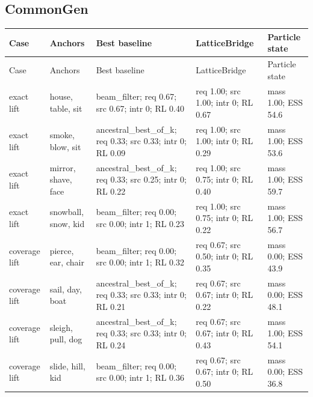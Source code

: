 \begingroup
\scriptsize
\setlength{\tabcolsep}{2pt}
\setlength{\LTleft}{0pt}
\setlength{\LTright}{0pt}
\renewcommand{\arraystretch}{1.08}

\subsection*{CommonGen}
\begin{longtable}{>{\raggedright\arraybackslash}p{}>{\raggedright\arraybackslash}p{}>{\raggedright\arraybackslash}p{}>{\raggedright\arraybackslash}p{}>{\raggedright\arraybackslash}p{}}
\toprule
Case & Anchors & Best baseline & LatticeBridge & Particle state \\
\midrule
\endfirsthead
\toprule
Case & Anchors & Best baseline & LatticeBridge & Particle state \\
\midrule
\endhead
exact lift & house, table, sit & beam\_filter; req 0.67; src 0.67; intr 0; RL 0.40 & req 1.00; src 1.00; intr 0; RL 0.67 & mass 1.00; ESS 54.6 \\
\midrule
exact lift & smoke, blow, sit & ancestral\_best\_of\_k; req 0.33; src 0.33; intr 0; RL 0.09 & req 1.00; src 1.00; intr 0; RL 0.29 & mass 1.00; ESS 53.6 \\
\midrule
exact lift & mirror, shave, face & ancestral\_best\_of\_k; req 0.33; src 0.25; intr 0; RL 0.22 & req 1.00; src 0.75; intr 0; RL 0.40 & mass 1.00; ESS 59.7 \\
\midrule
exact lift & snowball, snow, kid & beam\_filter; req 0.00; src 0.00; intr 1; RL 0.23 & req 1.00; src 0.75; intr 0; RL 0.22 & mass 1.00; ESS 56.7 \\
\midrule
coverage lift & pierce, ear, chair & beam\_filter; req 0.00; src 0.00; intr 1; RL 0.32 & req 0.67; src 0.50; intr 0; RL 0.35 & mass 0.00; ESS 43.9 \\
\midrule
coverage lift & sail, day, boat & ancestral\_best\_of\_k; req 0.33; src 0.33; intr 0; RL 0.21 & req 0.67; src 0.67; intr 0; RL 0.22 & mass 0.00; ESS 48.1 \\
\midrule
coverage lift & sleigh, pull, dog & ancestral\_best\_of\_k; req 0.33; src 0.33; intr 0; RL 0.24 & req 0.67; src 0.67; intr 0; RL 0.43 & mass 1.00; ESS 54.1 \\
\midrule
coverage lift & slide, hill, kid & beam\_filter; req 0.00; src 0.00; intr 1; RL 0.36 & req 0.67; src 0.67; intr 0; RL 0.50 & mass 0.00; ESS 36.8 \\
\midrule
\bottomrule
\end{longtable}

